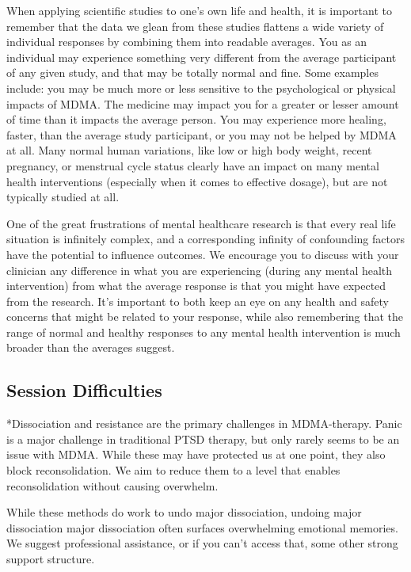 \documentclass[12pt,letterpaper]{book}
\begin{document}
When applying scientific studies to one's own life and health, it is important to remember that the data we glean from these studies flattens a wide variety of individual responses by combining them into readable averages. You as an individual may experience something very different from the average participant of any given study, and that may be totally normal and fine. Some examples include: you may be much more or less sensitive to the psychological or physical impacts of MDMA. The medicine may impact you for a greater or lesser amount of time than it impacts the average person. You may experience more healing, faster, than the average study participant, or you may not be helped by MDMA at all. Many normal human variations, like low or high body weight, recent pregnancy, or menstrual cycle status clearly have an impact on many mental health interventions (especially when it comes to effective dosage), but are not typically studied at all.

One of the great frustrations of mental healthcare research is that every real life situation is infinitely complex, and a corresponding infinity of confounding factors have the potential to influence outcomes. We encourage you to discuss with your clinician any difference in what you are experiencing (during any mental health intervention) from what the average response is that you might have expected from the research. It's important to both keep an eye on any health and safety concerns that might be related to your response, while also remembering that the range of normal and healthy responses to any mental health intervention is much broader than the averages suggest.
\subsection{Session Difficulties}
\label{sec:dissociationandresistance}
*Dissociation and resistance are the primary challenges in MDMA-therapy. Panic is a major challenge in traditional PTSD therapy, but only rarely seems to be an issue with MDMA. While these may have protected us at one point, they also block reconsolidation. We aim to reduce them to a level that enables reconsolidation without causing overwhelm.

While these methods do work to undo major dissociation, undoing major dissociation major dissociation often surfaces overwhelming emotional memories. We suggest professional assistance, or if you can't access that, some other strong support structure.
\end{document}
